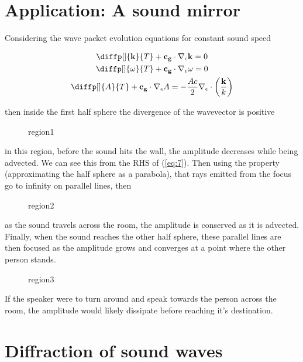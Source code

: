 \section{Application: A sound mirror}%
\label{sec:application_a_sound_mirror}


Considering the wave packet evolution equations for constant sound speed


\begin{gather}
  \diffp[]{{\bf k}}{T} + {\bf c_{g}} \cdot \nabla _{\epsilon } {\bf k} = 0 \label{eq:5}\\
  \diffp[]{\omega }{T} +  {\bf c_{g}} \cdot \nabla _{\epsilon } \omega  = 0 \label{eq:6}\\
  \diffp[]{A}{T} +  {\bf c_{g}}\cdot\nabla _{\epsilon } A  = - \frac{Ac}{2} \nabla
  _{\epsilon } \cdot \left( \frac{{\bf k}}{k} \right) \label{eq:7}
\end{gather}

then inside the first half sphere the divergence of the wavevector is positive

\begin{figure}[H]
    \centering
    \caption{region1}
    \label{fig:region1}
\end{figure}

in this region, before the sound hits the wall, the amplitude decreases while
being advected. We can see this from the RHS of (\ref{eq:7}).  Then using the
property (approximating the half sphere as a parabola), that rays emitted from
the focus go to infinity on parallel lines, then

\begin{figure}[H]
    \centering
    \caption{region2}
    \label{fig:region2}
\end{figure}

as the sound travels across the room, the amplitude is conserved as it is
advected. Finally, when the sound reaches the other half sphere, these parallel
lines are then focused as the amplitude grows and converges at a point where
the other person stands.


\begin{figure}[H]
    \centering
    \caption{region3}
    \label{fig:region3}
\end{figure}

If the speaker were to turn around and speak towards the person across the
room, the amplitude would likely dissipate before reaching it's destination.

\section{Diffraction of sound waves}%
\label{sec:diffraction_of_sound_waves}

